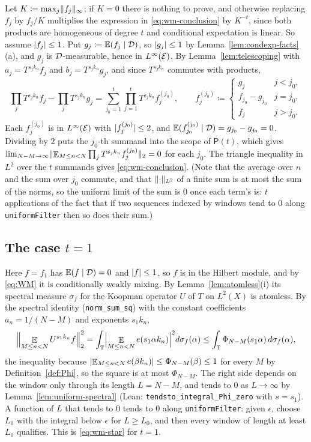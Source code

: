 Let $K \coloneqq \max_j \lVert f_j \rVert_\infty$; if $K = 0$ there is nothing to prove, and otherwise
replacing $f_j$ by $f_j/K$ multiplies the expression in \eqref{eq:wm-conclusion} by $K^{-t}$,
since both products are homogeneous of degree $t$ and conditional expectation is linear.  So
assume $\lvert f_j \rvert \leq 1$.  Put $g_j \coloneqq \mathbb{E}(f_j\mid\mathcal{D})$, so $\lvert g_j \rvert \leq 1$ by
Lemma~\ref{lem:condexp-facts}(a), and $g_j$ is $\mathcal{D}$-measurable, hence in $L^{\infty}(\mathcal{E})$.
By Lemma~\ref{lem:telescoping} with $a_j = T^{s_jk_n}f_j$ and $b_j = T^{s_jk_n}g_j$, and since
$T^{s_jk_n}$ commutes with products,
\[
  \prod_{j} T^{s_j k_n} f_j - \prod_{j} T^{s_j k_n} g_j
  = \sum_{j_0=1}^{t} \prod_{j=1}^{t} T^{s_j k_n} f^{(j_0)}_j ,
  \qquad
  f^{(j_0)}_j \coloneqq
  \begin{cases}
    g_j & j < j_0 , \\
    f_{j_0} - g_{j_0} & j = j_0 , \\
    f_j & j > j_0 .
  \end{cases}
\]
Each $f^{(j_0)}_j$ is in $L^{\infty}(\mathcal{E})$ with $\lvert f^{(j_0)}_j \rvert \leq 2$, and
$\mathbb{E}(f^{(j_0)}_{j_0} \mid \mathcal{D}) = g_{j_0} - g_{j_0} = 0$.  Dividing by $2$ puts the $j_0$-th
summand into the scope of $\mathsf P(t)$, which gives
$\lim_{N-M \to \infty} \lVert \mathop{\mathbb{E}}_{M \leq n < N} \prod_j T^{s_jk_n} f^{(j_0)}_j \rVert_2 = 0$ for each $j_0$.  The
triangle inequality in $L^2$ over the $t$ summands gives \eqref{eq:wm-conclusion}.  (Note that
the average over $n$ and the sum over $j_0$ commute, and that
$\lVert \cdot \rVert_{L^2}$ of a finite sum is at most the sum of the norms, so the uniform limit of
the sum is $0$ once each term's is: $t$ applications of the fact that if two sequences indexed
by windows tend to $0$ along \texttt{uniformFilter} then so does their sum.)

\subsection*{The case $t = 1$}

Here $f = f_1$ has $\mathbb{E}(f\mid\mathcal{D}) = 0$ and $\lvert f \rvert \leq 1$, so $f$ is in the Hilbert
module, and by \eqref{eq:WM} it is conditionally weakly mixing.  By
Lemma~\ref{lem:atomless}(i) its spectral measure $\sigma_f$ for the Koopman operator $U$ of $T$
on $L^2(X)$ is atomless.  By the spectral identity (\texttt{norm\_sum\_sq}) with the constant
coefficients $a_n = 1/(N-M)$ and exponents $s_1 k_n$,
\[
  \Bigl\lVert \mathop{\mathbb{E}}_{M \leq n < N} U^{s_1 k_n} f \Bigr\rVert_2^2
    = \int_{\mathbb{T}} \Bigl\lvert \mathop{\mathbb{E}}_{M \leq n < N} e(s_1 \alpha k_n) \Bigr\rvert^2 d\sigma_f(\alpha)
    \leq \int_{\mathbb{T}} \Phi_{N-M}(s_1\alpha)\, d\sigma_f(\alpha) ,
\]
the inequality because $\lvert \mathop{\mathbb{E}}_{M \leq n < N} e(\beta k_n) \rvert \leq \Phi_{N-M}(\beta) \leq 1$ for every $M$
by Definition~\ref{def:Phi}, so the square is at most $\Phi_{N-M}$.  The right side depends on
the window only through its length $L = N-M$, and tends to $0$ as $L \to \infty$ by
Lemma~\ref{lem:uniform-spectral} (Lean: \texttt{tendsto\_integral\_Phi\_zero} with $s = s_1$).
A function of $L$ that tends to $0$ tends to $0$ along \texttt{uniformFilter}: given
$\epsilon$, choose $L_0$ with the integral below $\epsilon$ for $L \geq L_0$, and then every
window of length at least $L_0$ qualifies.  This is \eqref{eq:wm-star} for $t = 1$.

